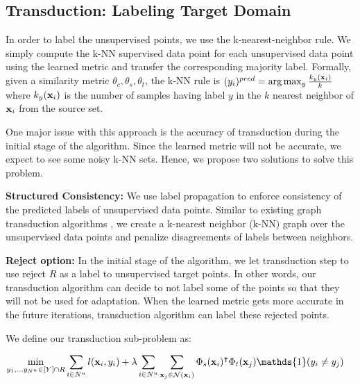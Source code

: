 

\subsection{Transduction: Labeling Target Domain}
\label{label}
In order to label the unsupervised points, we use the k-nearest-neighbor rule. We simply compute the k-NN supervised data point for each unsupervised data point using the learned metric and transfer the corresponding majority label. Formally, given a similarity metric $\theta_c, \theta_s, \theta_t$, the k-NN rule is 
$(y_i)^{pred} = \arg\max_y \frac{k_y(\mathbf{x}_i)}{k}$ where $k_y(\mathbf{x}_i)$ is the number of samples having label $y$ in the $k$ nearest neighbor of $\mathbf{x}_i$ from the source set. 

One major issue with this approach is the accuracy of transduction during the initial stage of the algorithm. Since the learned metric will not be accurate, we expect to see some noisy k-NN sets. Hence, we propose two solutions to solve this problem.

\textbf{Structured Consistency:} We use label propagation to enforce consistency of the predicted labels of unsupervised data points. Similar to existing graph transduction algorithms \cite{label_prop1,label_prop2}, we create a k-nearest neighbor (k-NN) graph over the unsupervised data points and penalize disagreements of labels between neighbors.

\textbf{Reject option:} In the initial stage of the algorithm, we let transduction step to use reject $R$ as a label to unsupervised target points. In other words, our transduction algorithm can decide to not label some of the points so that they will not be used for adaptation. When the learned metric gets more accurate in the future iterations, transduction algorithm can label these rejected points.

We define our transduction sub-problem as:

\begin{equation}
\begin{aligned}
\min_{y_1, \ldots y_{N^u} \in [Y] \cap R}  &\sum_{i \in N^u} l(\xui, y_i) + \lambda \sum_{i \in N^u} \sum_{\xuj \in \mathcal{N}(\xui)} \Phi_s(\xui)^\intercal \Phi_t(\xuj)\mathds{1}(y_i \neq y_j)
\end{aligned}
\label{robtran}
\end{equation}

